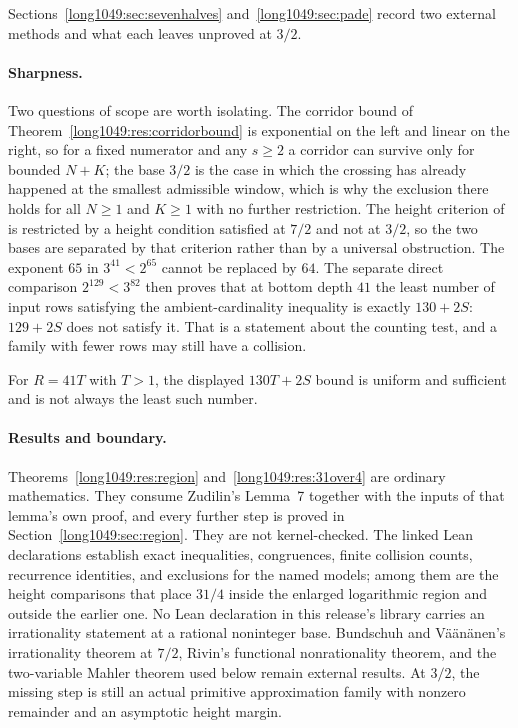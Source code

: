 \documentclass[11pt]{article}
\begin{document}
Sections~\ref{long1049:sec:sevenhalves} and~\ref{long1049:sec:pade} record two external methods
and what each leaves unproved at $3/2$.

\paragraph{Sharpness.}
Two questions of scope are worth isolating.  The corridor bound of
Theorem~\ref{long1049:res:corridorbound} is exponential on the left and linear on the
right, so for a fixed numerator and any $s\ge2$ a corridor can survive only for
bounded $N+K$; the base $3/2$ is the case in which the crossing has already
happened at the smallest admissible window, which is why the exclusion there
holds for all $N\ge1$ and $K\ge1$ with no further restriction.  The height
criterion of~\cite{bv1994} is restricted by a height condition satisfied at
$7/2$ and not at $3/2$, so the two bases are separated by that criterion rather
than by a universal obstruction.  The exponent $65$ in
$3^{41}<2^{65}$ cannot be replaced by $64$.  The separate direct comparison
$2^{129}<3^{82}$ then proves that at bottom depth $41$ the least number of input
rows satisfying the ambient-cardinality inequality is exactly $130+2S$:
$129+2S$ does not satisfy it.  That is a statement about the counting test, and
a family with fewer rows may still have a collision.

For $R=41T$ with $T>1$, the displayed $130T+2S$ bound is uniform and sufficient
and is not always the least such number.

\statusboundary

\paragraph{Results and boundary.}
Theorems~\ref{long1049:res:region} and~\ref{long1049:res:31over4} are ordinary mathematics.  They
consume Zudilin's Lemma~7 together with the inputs of that lemma's own proof,
and every further step is proved in Section~\ref{long1049:sec:region}.  They are not
kernel-checked.  The linked Lean declarations establish exact inequalities,
congruences, finite collision counts, recurrence identities, and exclusions for
the named models; among them are the height comparisons that place \(31/4\)
inside the enlarged logarithmic region and outside the earlier one.  No Lean
declaration in this release's library carries an irrationality statement at a
rational noninteger base.  Bundschuh and V\"a\"an\"anen's irrationality theorem
at \(7/2\), Rivin's functional nonrationality theorem, and the two-variable
Mahler theorem used below remain external results.  At \(3/2\), the missing
step is still an actual primitive approximation family with nonzero remainder
and an asymptotic height margin.
\end{document}
